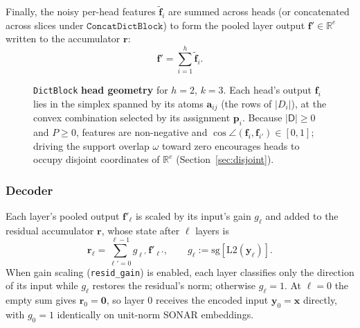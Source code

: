 Finally, the noisy per-head features $\tilde{\mathbf{f}}_i$ are summed
across heads (or concatenated across slices under
$\mathtt{ConcatDictBlock}$) to form the pooled layer output
$\mathbf{f}' \in \mathbb{R}^{e}$ written to the accumulator $\mathbf{r}$:
\begin{equation}
	\mathbf{f}' = \sum^{h}_{i=1}\tilde{\mathbf{f}}_{i}.
	\label{eq:pool}
\end{equation}

\begin{figure}[tp]
\centering

\caption[Per-head geometry]{\texttt{DictBlock} \textbf{head geometry} for $h{=}2$, $k{=}3$.
	Each head's output $\mathbf{f}_i$ lies in the simplex spanned by its
	atoms $\mathbf{a}_{ij}$ (the rows of $\lvert D_i\rvert$), at the convex
	combination selected by its assignment $\mathbf{p}_i$. Because
	$\lvert\mathsf{D}\rvert \geq 0$ and $P \geq 0$, features are
	non-negative and $\cos\angle(\mathbf{f}_i, \mathbf{f}_{i'}) \in [0,1]$;
	driving the support overlap $\omega$ toward zero encourages heads to
	occupy disjoint coordinates of $\mathbb{R}^e$
	(Section~\ref{sec:disjoint}).}
\label{fig:head-simplex}
\end{figure}

\subsubsection{Decoder}
\label{sec:decoder}
Each layer's pooled output $\mathbf{f}'_\ell$ is scaled by its input's
gain $g_\ell$ and added to the residual accumulator $\mathbf{r}$, whose
state after $\ell$ layers is
\begin{equation}
	\mathbf{r}_\ell = \sum_{\ell'=0}^{\ell-1} g_{\ell'}\,\mathbf{f}'_{\ell'},
	\qquad
	g_\ell := \mathrm{sg}\!\left[\mathrm{L2}(\mathbf{y}_\ell)\right].
	\label{eq:accum}
\end{equation}
When gain scaling (\texttt{resid\_gain}) is enabled, each layer
classifies only the direction of its input while $g_\ell$ restores the
residual's norm; otherwise $g_\ell = 1$. At $\ell = 0$ the empty sum
gives $\mathbf{r}_0 = \mathbf{0}$, so layer 0 receives the encoded input
$\mathbf{y}_0 = \mathbf{x}$ directly, with $g_0 = 1$ identically on
unit-norm SONAR embeddings.

